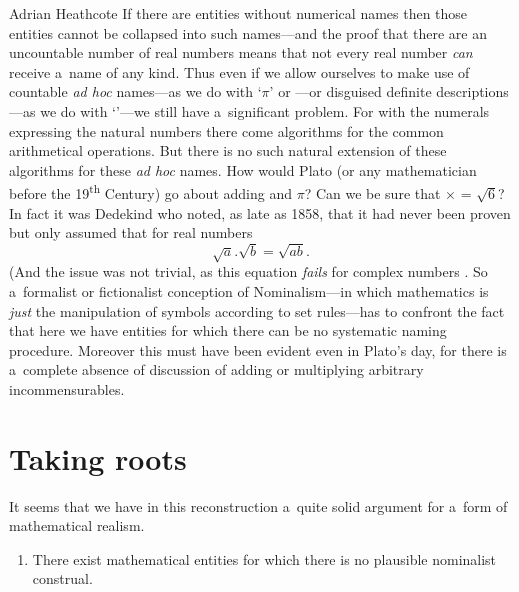 \begin{artengenv}{Adrian Heathcote}
If there are entities without numerical names then those entities cannot be collapsed into such names---and the proof that there are an uncountable number of real numbers means that not every real number \textit{can} receive a~name of any kind. Thus even if we allow ourselves to make use of countable \textit{ad hoc} names---as we do with `$\pi$' or ---or disguised definite descriptions---as we do with `\sqrtwo'---we still have a~significant problem. For with the numerals expressing the natural numbers there come algorithms for the common arithmetical operations. But there is no such natural extension of these algorithms for these \textit{ad hoc} names. How would Plato (or any mathematician before the 19\textsuperscript{th} Century) go about adding \sqrtwo and $\pi$? Can we be sure that \sqrtwo $\times$ \sqrthree = $\sqrt{6}$? In fact it was Dedekind who noted, as late as 1858, that it had never been proven but only assumed that for real numbers
$$\sqrt{a} . \sqrt{b} = \sqrt{ab}.$$
(And the issue was not trivial, as this equation \textit{fails} for complex numbers \parencite[see][]{waterhouse_square_2012}. So a~formalist or fictionalist conception of Nominalism---in which mathematics is \textit{just} the manipulation of symbols according to set rules---has to confront the fact that here we have entities for which there can be no systematic naming procedure. Moreover this must have been evident even in Plato's day, for there is a~complete absence of discussion of adding or multiplying arbitrary incommensurables.

\section{Taking roots}


It seems that we have in this reconstruction a~quite solid argument for a~form of mathematical realism.
\begin{enumerate}[label=\emph{\alph*})]
  \item There exist mathematical entities for which there is no plausible nominalist construal.
  

\end{enumerate}
\end{artengenv}
